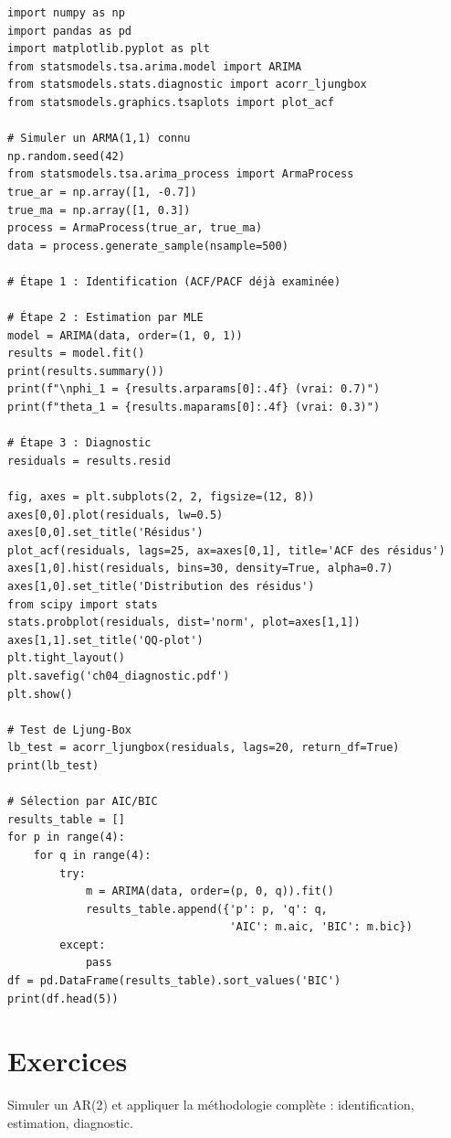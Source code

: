 \begin{codeblock}[title=\textbf{Python}]
\begin{verbatim}
import numpy as np
import pandas as pd
import matplotlib.pyplot as plt
from statsmodels.tsa.arima.model import ARIMA
from statsmodels.stats.diagnostic import acorr_ljungbox
from statsmodels.graphics.tsaplots import plot_acf

# Simuler un ARMA(1,1) connu
np.random.seed(42)
from statsmodels.tsa.arima_process import ArmaProcess
true_ar = np.array([1, -0.7])
true_ma = np.array([1, 0.3])
process = ArmaProcess(true_ar, true_ma)
data = process.generate_sample(nsample=500)

# Étape 1 : Identification (ACF/PACF déjà examinée)

# Étape 2 : Estimation par MLE
model = ARIMA(data, order=(1, 0, 1))
results = model.fit()
print(results.summary())
print(f"\nphi_1 = {results.arparams[0]:.4f} (vrai: 0.7)")
print(f"theta_1 = {results.maparams[0]:.4f} (vrai: 0.3)")

# Étape 3 : Diagnostic
residuals = results.resid

fig, axes = plt.subplots(2, 2, figsize=(12, 8))
axes[0,0].plot(residuals, lw=0.5)
axes[0,0].set_title('Résidus')
plot_acf(residuals, lags=25, ax=axes[0,1], title='ACF des résidus')
axes[1,0].hist(residuals, bins=30, density=True, alpha=0.7)
axes[1,0].set_title('Distribution des résidus')
from scipy import stats
stats.probplot(residuals, dist='norm', plot=axes[1,1])
axes[1,1].set_title('QQ-plot')
plt.tight_layout()
plt.savefig('ch04_diagnostic.pdf')
plt.show()

# Test de Ljung-Box
lb_test = acorr_ljungbox(residuals, lags=20, return_df=True)
print(lb_test)

# Sélection par AIC/BIC
results_table = []
for p in range(4):
    for q in range(4):
        try:
            m = ARIMA(data, order=(p, 0, q)).fit()
            results_table.append({'p': p, 'q': q,
                                  'AIC': m.aic, 'BIC': m.bic})
        except:
            pass
df = pd.DataFrame(results_table).sort_values('BIC')
print(df.head(5))
\end{verbatim}
\end{codeblock}

\section{Exercices}

\begin{exercice}[$\star$]
Simuler un AR(2) et appliquer la m\'ethodologie compl\`ete : identification, estimation, diagnostic.
\end{exercice}

